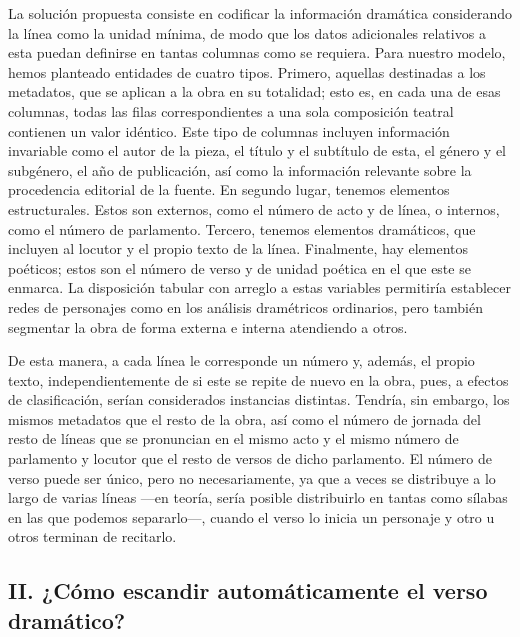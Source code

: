 La solución propuesta consiste en codificar la información dramática considerando la línea como la unidad mínima, de modo que los datos adicionales relativos a esta puedan definirse en tantas columnas como se requiera. Para nuestro modelo, hemos planteado entidades de cuatro tipos. Primero, aquellas destinadas a los metadatos, que se aplican a la obra en su totalidad; esto es, en cada una de esas columnas, todas las filas correspondientes a una sola composición teatral contienen un valor idéntico. Este tipo de columnas incluyen información invariable como el autor de la pieza, el título y el subtítulo de esta, el género y el subgénero, el año de publicación, así como la información relevante sobre la procedencia editorial de la fuente. En segundo lugar, tenemos elementos estructurales. Estos son externos, como el número de acto y de línea, o internos, como el número de parlamento. Tercero, tenemos elementos dramáticos, que incluyen al locutor y el propio texto de la línea. Finalmente, hay elementos poéticos; estos son el número de verso y de unidad poética en el que este se enmarca. La disposición tabular con arreglo a estas variables permitiría establecer redes de personajes como en los análisis dramétricos ordinarios, pero también segmentar la obra de forma externa e interna atendiendo a otros.

De esta manera, a cada línea le corresponde un número y, además, el propio texto, independientemente de si este se repite de nuevo en la obra, pues, a efectos de clasificación, serían considerados instancias distintas. Tendría, sin embargo, los mismos metadatos que el resto de la obra, así como el número de jornada del resto de líneas que se pronuncian en el mismo acto y el mismo número de parlamento y locutor que el resto de versos de dicho parlamento. El número de verso puede ser único, pero no necesariamente, ya que a veces se distribuye a lo largo de varias líneas —en teoría, sería posible distribuirlo en tantas como sílabas en las que podemos separarlo—, cuando el verso lo inicia un personaje y otro u otros terminan de recitarlo.

\subsection{II. ¿Cómo escandir automáticamente el verso dramático?}

